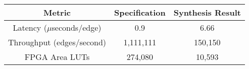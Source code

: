 \begin{table}[H]
\begin{center}
\begin{tabular}{|c|c|c|}
    \hline
    \textbf{Metric}             & \textbf{Specification} & \textbf{Synthesis Result} \\
    \hline
    Latency ($\mu$seconds/edge)  &   0.9  & \textcolor{myred}{6.66} \\
    \hline
    Throughput (edges/second)  &   1,111,111 & \textcolor{myred}{150,150} \\
    \hline
    FPGA Area \glspl{LUT} & 274,080  & \textcolor{mygreen}{10,593} \\
    \hline
\end{tabular}
\label{table:HBA_results}
\end{center}
\end{table}